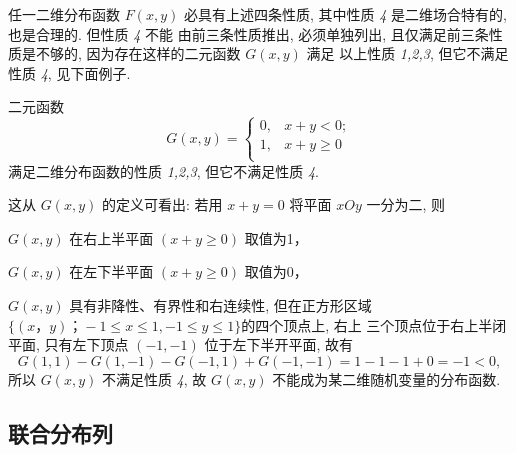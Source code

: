    任一二维分布函数 $F(x,y)$ 必具有上述四条性质, 其中性质 \textit{4} 是二维场合特有的, 也是合理的. 但性质 \textit{4} 不能
   由前三条性质推出, 必须单独列出, 且仅满足前三条性质是不够的, 因为存在这样的二元函数 $G(x,y)$ 满足
   以上性质 \textit{1,2,3}, 但它不满足性质 \textit{4}, 见下面例子.

   \begin{example}\label{exam:3.1.1}
   	二元函数
   	\[
   	 	G(x,y)=\begin{cases}
   	 		0,	& x+y<0;\\
   	 		1,	& x+y\geq 0 \\
   	 	\end{cases}
   	\]
   	满足二维分布函数的性质 \textit{1,2,3}, 但它不满足性质 \textit{4}.

    这从 $G(x,y)$ 的定义可看出: 若用 $x+y=0$ 将平面 $xOy$ 一分为二, 则
 
    $G(x,y)$ 在右上半平面 $(x+y\geq 0)$ 取值为1，
   
    $G(x,y)$ 在左下半平面 $(x+y\geq 0)$ 取值为0，

    $G(x,y)$ 具有非降性、有界性和右连续性, 但在正方形区域 $\{(x，y)；-1\leq x\leq 1,-1\leq y\leq 1\}$的四个顶点上, 右上
    三个顶点位于右上半闭平面, 只有左下顶点 $(-1,-1)$ 位于左下半开平面, 故有
    \[
     	G(1,1)-G(1,-1)-G(-1,1)+G(-1,-1)=1-1-1+0=-1<0,
    \]
	所以 $G(x,y)$ 不满足性质 \textit{4}, 故 $G(x,y)$ 不能成为某二维随机变量的分布函数.
   \end{example}

   \subsection{联合分布列}\label{ssec:3.1.3}

